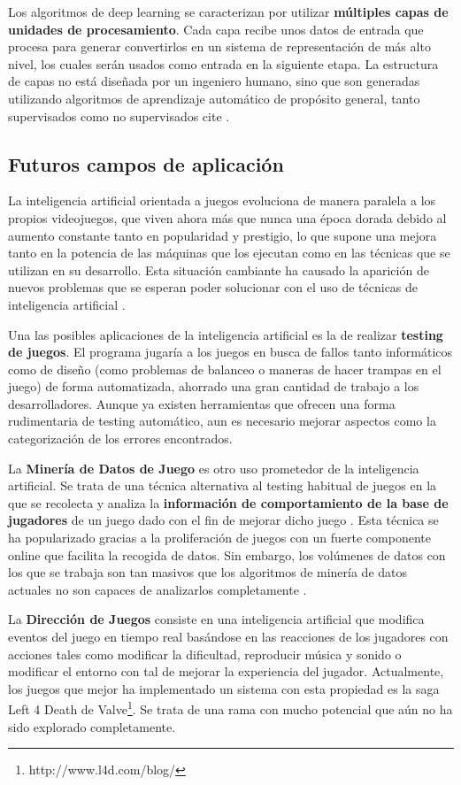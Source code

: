 Los algoritmos de deep learning se caracterizan por utilizar \textbf{múltiples capas de unidades de procesamiento}. Cada capa recibe unos datos de entrada que procesa para generar convertirlos en un sistema de representación de más alto nivel, los cuales serán usados como entrada en la siguiente etapa. La estructura de capas no está diseñada por un ingeniero humano, sino que son generadas utilizando algoritmos de aprendizaje automático de propósito general, tanto supervisados como no supervisados cite \cite{deep_learning}. 

\subsection{Futuros campos de aplicación}
La inteligencia artificial orientada a juegos evoluciona de manera paralela a los propios videojuegos, que viven ahora más que nunca una época dorada debido al aumento constante tanto en popularidad y prestigio, lo que supone una mejora tanto en la potencia de las máquinas que los ejecutan como en las técnicas que se utilizan en su desarrollo. Esta situación cambiante ha causado la aparición de nuevos problemas que se esperan poder solucionar con el uso de técnicas de inteligencia artificial \cite{ai_and_games}.

Una las posibles aplicaciones de la inteligencia artificial es la de realizar \textbf{testing de juegos}. El programa jugaría a los juegos en busca de fallos tanto informáticos como de diseño (como problemas de balanceo o maneras de hacer trampas en el juego) de forma automatizada, ahorrado una gran cantidad de trabajo a los desarrolladores. Aunque ya existen herramientas que ofrecen una forma rudimentaria de testing automático, aun es necesario mejorar aspectos como la categorización de los errores encontrados.

La \textbf{Minería de Datos de Juego} es otro uso prometedor de la inteligencia artificial. Se trata de una técnica alternativa al testing habitual de juegos en la que se recolecta y analiza la \textbf{información de comportamiento de la base de jugadores} de un juego dado con el fin de mejorar dicho juego \cite{ai_revisited}. Esta técnica se ha popularizado gracias a la proliferación de juegos con un fuerte componente online que facilita la recogida de datos. Sin embargo, los volúmenes de datos con los que se trabaja son tan masivos que los algoritmos de minería de datos actuales no son capaces de analizarlos completamente \cite{ai_revisited}.

La \textbf{Dirección de Juegos} consiste en una inteligencia artificial que modifica eventos del juego en tiempo real basándose en las reacciones de los jugadores con acciones tales como modificar la dificultad, reproducir música y sonido o modificar el entorno con tal de mejorar la experiencia del jugador. Actualmente, los juegos que mejor ha implementado un sistema con esta propiedad es la saga Left 4 Death de Valve\footnote{http://www.l4d.com/blog/}. Se trata de una rama con mucho potencial que aún no ha sido explorado completamente.

